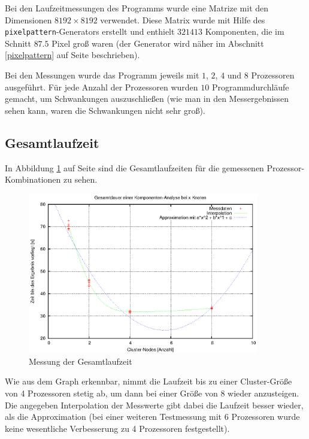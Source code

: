 Bei den Laufzeitmessungen des Programms wurde eine Matrize mit den Dimensionen $8192 \times 8192$ verwendet. Diese Matrix wurde mit Hilfe des \texttt{pixelpattern}-Generators erstellt und enthielt $321413$ Komponenten, die im Schnitt $87.5$ Pixel groß waren (der Generator wird näher im Abschnitt  \ref{pixelpattern} auf Seite \pageref{pixelpattern} beschrieben).

Bei den Messungen wurde das Programm jeweils mit $1$, $2$, $4$ und $8$ Prozessoren ausgeführt. Für jede Anzahl der Prozessoren wurden $10$ Programmdurchläufe gemacht, um Schwankungen auszuschließen (wie man in den Messergebnissen sehen kann, waren die Schwankungen nicht sehr groß).

\subsection{Gesamtlaufzeit} \label{bench:whole}

In Abbildung \ref{fig:bench_whole} auf Seite \pageref{fig:bench_whole} sind die Gesamtlaufzeiten für die gemessenen Prozessor-Kombinationen zu sehen.

\begin{figure}[tbhp]
	\centering
	\includegraphics[width=0.9\textwidth]{images/whole_plod.eps}
	\caption{Messung der Gesamtlaufzeit}
	\label{fig:bench_whole}
\end{figure}

Wie aus dem Graph erkennbar, nimmt die Laufzeit bis zu einer Cluster-Größe von 4 Prozessoren stetig ab, um dann bei einer Größe von 8 wieder anzusteigen. Die angegeben Interpolation der Messwerte gibt dabei die Laufzeit besser wieder, als die Approximation (bei einer weiteren Testmessung mit 6 Prozessoren wurde keine wesentliche Verbesserung zu 4 Prozessoren festgestellt).

